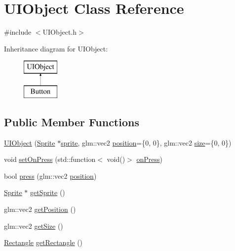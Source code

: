 \hypertarget{class_u_i_object}{}\section{U\+I\+Object Class Reference}
\label{class_u_i_object}


{\ttfamily \#include $<$U\+I\+Object.\+h$>$}

Inheritance diagram for U\+I\+Object\+:\begin{figure}[H]
\begin{center}
\leavevmode
\includegraphics[height=2.000000cm]{d2/d62/class_u_i_object}
\end{center}
\end{figure}
\subsection*{Public Member Functions}
\begin{DoxyCompactItemize}
\item 
\hyperlink{class_u_i_object_a3d8e551cf42792f5e71e7d38733c03e5}{U\+I\+Object} (\hyperlink{class_sprite}{Sprite} $\ast$\hyperlink{class_u_i_object_a20929a89f31c811f44de45e2116bfed3}{sprite}, glm\+::vec2 \hyperlink{class_u_i_object_a6a16576616e633af2f212624ecc6cb45}{position}=\{0, 0\}, glm\+::vec2 \hyperlink{class_u_i_object_a8aff4ab7d58367300405639712ade234}{size}=\{0, 0\})
\item 
void \hyperlink{class_u_i_object_ac1e5c7ea89b7a37838fc6cdb9fba4bb9}{set\+On\+Press} (std\+::function$<$ void()$>$ \hyperlink{class_u_i_object_a3b5769b006ba810dd1d27e71f6b4dd0a}{on\+Press})
\item 
bool \hyperlink{class_u_i_object_a381ecb40cae1f86fbe5db3c4f1f99d1f}{press} (glm\+::vec2 \hyperlink{class_u_i_object_a6a16576616e633af2f212624ecc6cb45}{position})
\item 
\hyperlink{class_sprite}{Sprite} $\ast$ \hyperlink{class_u_i_object_a416b659a6965e66da7d29ad995a265e9}{get\+Sprite} ()
\item 
glm\+::vec2 \hyperlink{class_u_i_object_a45fc2fda01918da9ffb3c3c26d955e5a}{get\+Position} ()
\item 
glm\+::vec2 \hyperlink{class_u_i_object_a18ca5451ce1d3b6a17ec334660098cca}{get\+Size} ()
\item 
\hyperlink{class_rectangle}{Rectangle} \hyperlink{class_u_i_object_a187f353380f78615200fba7f8dfba44a}{get\+Rectangle} ()
\end{DoxyCompactItemize}
